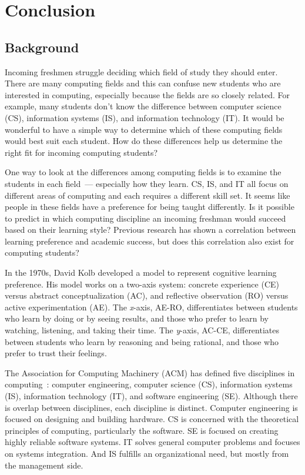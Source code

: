 \chapter{Conclusion}\label{chp:chapter5}
\section{Background}
Incoming freshmen struggle deciding which field of study they should enter. There are many computing fields and this can confuse new students who are interested in computing, especially because the fields are so closely related. For example, many students don't know the difference between computer science (CS), information systems (IS), and information technology (IT). It would be wonderful to have a simple way to determine which of these computing fields would best suit each student. How do these differences help us determine the right fit for incoming computing students?

One way to look at the differences among computing fields is to examine the students in each field~--- especially how they learn. CS, IS, and IT all focus on different areas of computing and each requires a different skill set. It seems like people in these fields have a preference for being taught differently. Is it possible to predict in which computing discipline an incoming freshman would succeed based on their learning style? Previous research has shown a correlation between learning preference and academic success, but does this correlation also exist for computing students?

In the 1970s, David Kolb developed a model to represent cognitive learning preference. His model works on a two-axis system: concrete experience (CE) versus abstract conceptualization (AC), and reflective observation (RO) versus active experimentation (AE). The \textit{x}-axis, AE-RO, differentiates between students who learn by doing or by seeing results, and those who prefer to learn by watching, listening, and taking their time. The \textit{y}-axis, AC-CE, differentiates between students who learn by reasoning and being rational, and those who prefer to trust their feelings.

The Association for Computing Machinery (ACM) has defined five disciplines in computing~\citep{shackelford2006}: computer engineering, computer science (CS), information systems (IS), information technology (IT), and software engineering (SE). Although there is overlap between disciplines, each discipline is distinct. Computer engineering is focused on designing and building hardware. CS is concerned with the theoretical principles of computing, particularly the software. SE is focused on creating highly reliable software systems. IT solves general computer problems and focuses on systems integration. And IS fulfills an organizational need, but mostly from the management side.

